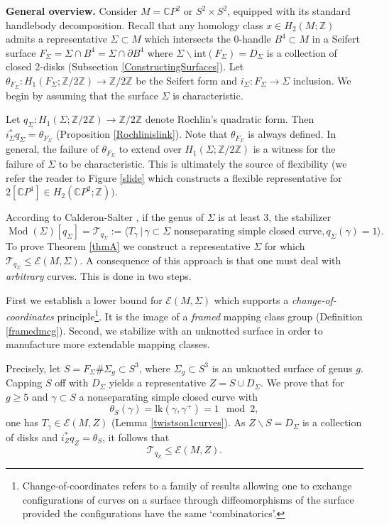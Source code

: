 \documentclass[10pt]{amsart}
\numberwithin{equation}{section}
\theoremstyle{plain}
\theoremstyle{definition}
\theoremstyle{remark}
\DeclareMathOperator{\Mod}{Mod}
\begin{document}
\textbf{General overview.} Consider $M = \mathbb{C}P^2$ or $S^2 \times S^2$, equipped with its standard handlebody decomposition. Recall that any homology class $x \in H_2(M;\mathbb{Z})$ admits a representative $\Sigma \subset M$ which intersects the 0-handle $B^4 \subset M$ in a Seifert surface $F_\Sigma = \Sigma \cap B^4 = \Sigma \cap \partial B^4$ where $\Sigma\backslash \textrm{int}(F_\Sigma) = D_\Sigma$ is a collection of closed 2-disks (Subsection \ref{ConstructingSurfaces}). Let $\theta_{F_\Sigma} : H_1(F_\Sigma;\mathbb{Z}/2\mathbb{Z}) \to \mathbb{Z}/2\mathbb{Z}$ be the Seifert form and $i_\Sigma : F_\Sigma \to \Sigma$ inclusion.  We begin by assuming that the surface $\Sigma$ is characteristic.


Let $q_\Sigma : H_1(\Sigma;\mathbb{Z}/2\mathbb{Z}) \to \mathbb{Z}/2\mathbb{Z}$ denote Rochlin's quadratic form. Then $i_{\Sigma}^*q_\Sigma = \theta_{F_\Sigma}$ (Proposition \ref{Rochlinislink}). Note that $\theta_{F_\Sigma}$ is always defined. In general, the failure of $\theta_{F_\Sigma}$ to extend over $H_1(\Sigma;\mathbb{Z}/2\mathbb{Z})$ is a witness for the failure of $\Sigma$ to be characteristic. This is ultimately the source of flexibility (we refer the reader to Figure \ref{slide} which constructs a flexible representative for $2[\mathbb{C}P^1] \in H_2(\mathbb{C}P^2;\mathbb{Z}))$. 

According to Calderon-Salter \cite[Proposition 5.1]{CalderonSalter}, if the genus of $\Sigma$ is at least 3, the stabilizer \[\Mod(\Sigma)[q_\Sigma] = \mathcal{T}_{q_\Sigma} := \langle T_{\gamma} \,|\, \gamma \subset \Sigma \textrm{ nonseparating simple closed curve}, q_\Sigma(\gamma) = 1 \rangle.\] To prove Theorem \ref{thmA} we construct a representative $\Sigma$ for which $\mathcal{T}_{q_\Sigma} \leq \mathcal{E}(M,\Sigma)$. A consequence of this approach is that one must deal with \textit{arbitrary} curves. This is done in two steps. 

First we establish a lower bound for $\mathcal{E}(M,\Sigma)$ which supports a \textit{change-of-coordinates} principle\footnote{Change-of-coordinates refers to a family of results allowing one to exchange configurations of curves on a surface through diffeomorphisms of the surface provided the configurations have the same `combinatorics'. }. It is the image of a \textit{framed} mapping class group (Definition \ref{framedmcg}). Second, we stabilize with an unknotted surface in order to manufacture more extendable mapping classes.


Precisely, let $S = F_\Sigma \# \Sigma_g \subset S^3$, where $\Sigma_g \subset S^3$ is an unknotted surface of genus $g$. Capping $S$ off with $D_\Sigma$ yields a representative $Z = S \cup D_\Sigma$. We prove that for $g \geq 5$ and $\gamma \subset S$ a nonseparating simple closed curve with \[\theta_S(\gamma) = \mathrm{lk}(\gamma,\gamma^+) =  1 \mod 2,\] one has $T_{\gamma} \in \mathcal{E}(M,Z)$ (Lemma \ref{twistson1curves}). As $Z\backslash S = D_\Sigma$ is a collection of disks and $i_Z^*q_Z = \theta_S$, it follows that \[\mathcal{T}_{q_Z} \leq \mathcal{E}(M,Z).\] 
\end{document}
